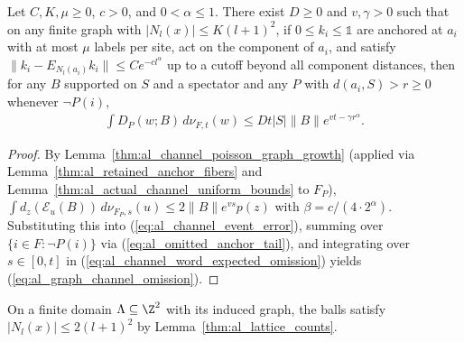\begin{lemma}
    \label{thm:al_graph_channel_omission}
    \leanok
    Let $C,K,\mu\ge0$, $c>0$, and $0<\alpha\le1$. There exist $D\ge0$ and
    $v,\gamma>0$ such that on any finite graph with $|N_l(x)|\le K(l+1)^2$, if
    $0\le k_i\le\mathbb 1$ are anchored at $a_i$ with at most $\mu$ labels per
    site, act on the component of $a_i$, and satisfy
    $\|k_i-E_{N_l(a_i)}k_i\|\le Ce^{-cl^\alpha}$ up to a cutoff beyond all
    component distances, then for any $B$ supported on $S$ and a spectator and
    any $P$ with $d(a_i,S)>r\ge0$ whenever $\neg P(i)$,
    \begin{align}
        \int D_P(w;B)\,d\nu_{F,t}(w)\le Dt|S|\|B\|e^{vt-\gamma r^\alpha}.
        \label{eq:al_graph_channel_omission}
    \end{align}
\end{lemma}
\begin{proof}\leanok
    By Lemma~\ref{thm:al_channel_poisson_graph_growth} (applied via
    Lemma~\ref{thm:al_retained_anchor_fibers} and
    Lemma~\ref{thm:al_actual_channel_uniform_bounds} to $F_P$),
    $\int d_z(\mathcal E_u(B))\,d\nu_{F_P,s}(u)\le 2\|B\|e^{vs}p(z)$ with
    $\beta=c/(4\cdot2^\alpha)$. Substituting this into
    (\ref{eq:al_channel_event_error}), summing over $\{i\in F:\neg P(i)\}$ via
    (\ref{eq:al_omitted_anchor_tail}), and integrating over $s\in[0,t]$ in
    (\ref{eq:al_channel_word_expected_omission}) yields
    (\ref{eq:al_graph_channel_omission}).
\end{proof}

On a finite domain $\Lambda\subseteq\Z^2$ with its induced graph, the balls
satisfy $|N_l(x)|\le2(l+1)^2$ by Lemma~\ref{thm:al_lattice_counts}.

